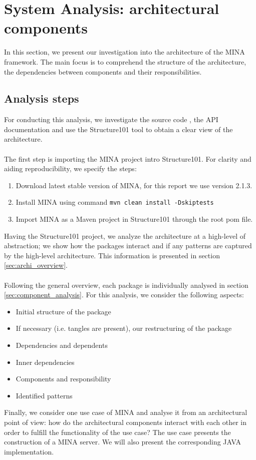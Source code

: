 \section{System Analysis: architectural components}
\label{sec:analysis_components}

In this section, we present our investigation into the architecture of the MINA framework. The main focus is to comprehend the structure of the architecture, the dependencies between components and their responsibilities. 
\subsection{Analysis steps}
For conducting this analysis, we investigate the source code \cite{mina-github}, the API documentation \cite{mina-reference} and use the Structure101 tool \cite{structure101} to obtain a clear view of the architecture.\\\\
The first step is importing the MINA project intro Structure101. For clarity and aiding reproducibility, we specify the steps:
\begin{enumerate}
    \item Download latest stable version of MINA, for this report we use version 2.1.3.
    \item Install MINA using command \texttt{mvn clean install -Dskiptests}
    \item Import MINA as a Maven project in Structure101 through the root pom file.
\end{enumerate}
Having the Structure101 project, we analyze the architecture at a high-level of abstraction; we show how the packages interact and if any patterns are captured by the high-level architecture. This information is presented in section \ref{sec:archi_overview}.\\\\
Following the general overview, each package is individually analysed in section \ref{sec:component_analysis}. For this analysis, we consider the following aspects:
\begin{itemize}
    \item Initial structure of the package
    \item If necessary (i.e. tangles are present), our restructuring of the package
    \item Dependencies and dependents
    \item Inner dependencies
    \item Components and responsibility
    \item Identified patterns
    
\end{itemize}
Finally, we consider one use case of MINA and analyse it from an architectural point of view: how do the architectural components interact with each other in order to fulfill the functionality of the use case? The use case presents the construction of a MINA server. We will also present the corresponding JAVA implementation.


